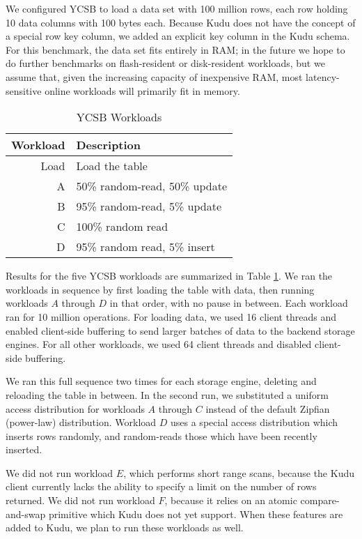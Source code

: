 \documentclass[twocolumn,9pt]{article}
\begin{document}
We configured YCSB to load a data set with 100 million rows, each row holding 10 data columns with 100
bytes each. Because Kudu does not have the concept of a special row key column, we added an explicit
key column in the Kudu schema. For this benchmark, the data set fits entirely in RAM; in the
future we hope to do further benchmarks on flash-resident or disk-resident workloads, but
we assume that, given the increasing capacity of inexpensive RAM, most latency-sensitive
online workloads will primarily fit in memory.

\begin{table}
  \begin{tabular}{r|l}
    Workload & Description\\\hline
    Load     & Load the table\\
    A        & 50\% random-read, 50\% update\\
    B        & 95\% random-read, 5\% update\\
    C        & 100\% random read\\
    D        & 95\% random read, 5\% insert
  \end{tabular}
  \caption{YCSB Workloads}
  \label{tab:ycsb_workloads}
\end{table}

Results for the five YCSB workloads are summarized in Table
\ref{tab:ycsb_workloads}. We ran the workloads in sequence by first loading the table
with data, then running workloads $A$ through $D$ in that order, with no pause in between.
Each workload ran for 10 million operations. For loading data, we used 16 client threads and enabled
client-side buffering to send larger batches of data to the backend storage engines. For all other
workloads, we used 64 client threads and disabled client-side buffering.

We ran this full sequence two times for each storage engine, deleting and reloading the
table in between. In the second run, we substituted a uniform access distribution for
workloads $A$ through $C$ instead of the default Zipfian (power-law) distribution.
Workload $D$ uses a special access distribution which inserts rows randomly, and random-reads
those which have been recently inserted.

We did not run workload $E$, which performs short range scans, because the Kudu client
currently lacks the ability to specify a limit on the number of rows returned. We did not
run workload $F$, because it relies on an atomic compare-and-swap primitive which Kudu does
not yet support. When these features are added to Kudu, we plan to run these workloads
as well.
\end{document}
